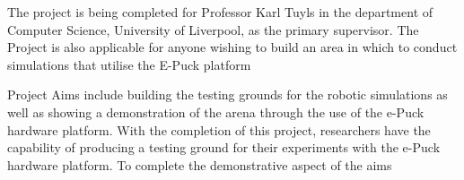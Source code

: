 The project is being completed for Professor Karl Tuyls in the
department of Computer Science, University of Liverpool, as the primary
supervisor.  The Project is also applicable for anyone wishing to build an area
in which to conduct simulations that utilise the E-Puck platform\cite{ePuckSite}

Project Aims include building the testing grounds for the robotic simulations as
well as showing a demonstration of the arena through the use of the e-Puck
hardware platform.  With the completion of this project, researchers have the
capability of producing a testing ground for their experiments with the e-Puck
hardware platform.  To complete the demonstrative aspect of the aims
